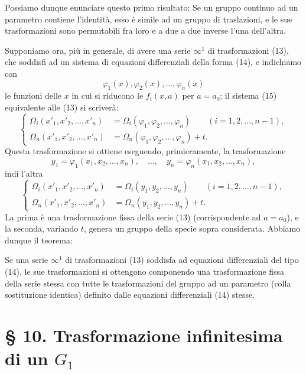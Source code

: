 \documentclass[11pt]{book}
\begin{document}
Possiamo dunque enunciare questo primo risultato:
Se un gruppo continuo ad un parametro contiene l'identità, esso è simile ad un gruppo di traslazioni, e le sue trasformazioni sono permutabili fra loro e a due a due inverse l'una dell'altra.

Supponiamo ora, più in generale, di avere una serie $\infty^1$ di trasformazioni (13), che soddisfi ad un sistema di equazioni differenziali della forma (14), e indichiamo con
\[
 \varphi_1(x),\varphi_2(x),\ldots,\varphi_n(x)
\]
le funzioni delle $x$ in cui si riducono le $f_i(x,a)$ per $a=a_0$; il sistema (15) equivalente alle (13) si scriverà:
\[
\left\{
\begin{aligned}
 \Omega_i(x'_1,x'_2,\ldots,x'_n)&=\Omega_i(\varphi_1,\varphi_2,\ldots,\varphi_n)
 \qquad (i=1,2,\ldots,n-1),\\
 \Omega_n(x'_1,x'_2,\ldots,x'_n)&=\Omega_n(\varphi_1,\varphi_2,\ldots,\varphi_n)+t.
\end{aligned}
\right.
\]
Questa trasformazione si ottiene eseguendo, primieramente, la trasformazione
\[
 y_1=\varphi_1(x_1,x_2,\ldots,x_n),\quad\ldots,\quad y_n=\varphi_n(x_1,x_2,\ldots,x_n),
\]
indi l'altra
\[
\left\{
\begin{aligned}
 \Omega_i(x'_1,x'_2,\ldots,x'_n)&=\Omega_i(y_1,y_2,\ldots,y_n)\qquad (i=1,2,\ldots,n-1),\\
 \Omega_n(x'_1,x'_2,\ldots,x'_n)&=\Omega_n(y_1,y_2,\ldots,y_n)+t.
\end{aligned}
\right.
\]
La prima è una trasformazione fissa della serie (13) (corrispondente ad $a=a_0$), e la seconda, variando $t$, genera un gruppo della specie sopra considerata. Abbiamo dunque il teorema:

Se una serie $\infty^1$ di trasformazioni (13) soddisfa ad equazioni differenziali del tipo (14), le sue trasformazioni si ottengono componendo una trasformazione fissa della serie stessa con tutte le trasformazioni del gruppo ad un parametro (colla sostituzione identica) definito dalle equazioni differenziali (14) stesse.

\section*{\S{} 10. Trasformazione infinitesima di un $G_1$}
\end{document}
